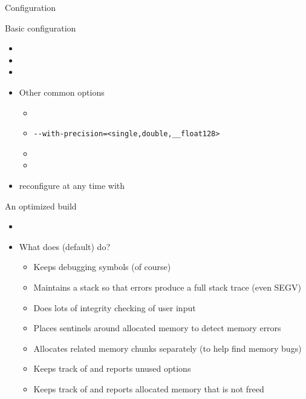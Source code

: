 \begin{frame}[fragile]{Configuration}
\begin{block}{Basic configuration}
\begin{itemize}\footnotesize
  \item {}
  \item {}
  \item {}
\end{itemize}
\end{block}
\begin{itemize}
\item Other common options
  \begin{itemize}\footnotesize
  \item {}
  \item %
    \verb|--with-precision=<single,double,__float128>|
  \item {}
  \item {}
  \end{itemize}
\item reconfigure at any time with \\
  {\footnotesize {}}
\end{itemize}
\end{frame}



\begin{frame}{An optimized build}
  \begin{itemize}
  \item {}
  \item What does  (default) do?
    \begin{itemize}
    \item Keeps debugging symbols (of course)
    \item Maintains a stack so that errors produce a full stack trace (even SEGV)
    \item Does lots of integrity checking of user input
    \item Places sentinels around allocated memory to detect memory errors
    \item Allocates related memory chunks separately (to help find memory bugs)
    \item Keeps track of and reports unused options
    \item Keeps track of and reports allocated memory that is not freed \\
      \quad {}
    \end{itemize}
  \end{itemize}
\end{frame}
